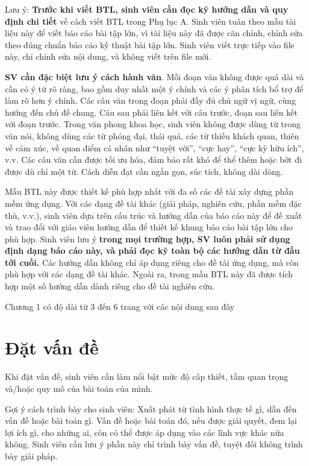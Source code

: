 \documentclass[../BTL.tex]{subfiles}
\begin{document}
Lưu ý: \textbf{Trước khi viết BTL, sinh viên cần đọc kỹ hướng dẫn và quy định chi tiết} về cách viết BTL trong Phụ lục A. Sinh viên tuân theo mẫu tài liệu này để viết báo cáo  bài tập lớn, vì tài liệu này đã được căn chỉnh, chỉnh sửa theo đúng chuẩn báo cáo kỹ thuật  bài tập lớn. Sinh viên viết trực tiếp vào file này, chỉ chỉnh sửa nội dung, và không viết trên file mới.

\textbf{SV cần đặc biệt lưu ý cách hành văn}. Mỗi đoạn văn không được quá dài và cần có ý tứ rõ ràng, bao gồm duy nhất một ý chính và các ý phân tích bổ trợ để làm rõ hơn ý chính. Các câu văn trong đoạn phải đầy đủ chủ ngữ vị ngữ, cùng hướng đến chủ đề chung. Câu sau phải liên kết với câu trước, đoạn sau liên kết với đoạn trước. Trong văn phong khoa học, sinh viên không được dùng từ trong văn nói, không dùng các từ phóng đại, thái quá, các từ thiếu khách quan, thiên về cảm xúc, về quan điểm cá nhân như “tuyệt vời”, “cực hay”, “cực kỳ hữu ích”, v.v. Các câu văn cần được tối ưu hóa, đảm bảo rất khó để thể thêm hoặc bớt đi được dù chỉ một từ. Cách diễn đạt cần ngắn gọn, súc tích, không dài dòng.

Mẫu BTL này được thiết kế phù hợp nhất với đa số các đề tài xây dựng phần mềm ứng dụng. Với các dạng đề tài khác (giải pháp, nghiên cứu, phần mềm đặc thù, v.v.), sinh viên dựa trên cấu trúc và hướng dẫn của báo cáo này để đề xuất và trao đổi với giáo viên hướng dẫn để thiết kế khung báo cáo  bài tập lớn cho phù hợp. Sinh viên lưu ý \textbf{trong mọi trường hợp, SV luôn phải sử dụng định dạng báo cáo này, và phải đọc kỹ toàn bộ các hướng dẫn từ đầu tới cuối.} Các hướng dẫn không chỉ áp dụng riêng cho đề tài ứng dụng, mà còn phù hợp với các dạng đề tài khác. Ngoài ra, trong mẫu BTL này đã được tích hợp một số hướng dẫn dành riêng cho đề tài nghiên cứu.

Chương 1 có độ dài từ 3 đến 6 trang với các nội dung sau đây

\section{Đặt vấn đề}
\label{section:1.1}
Khi đặt vấn đề, sinh viên cần làm nổi bật mức độ cấp thiết, tầm quan trọng và/hoặc quy mô của bài toán của mình.

Gợi ý cách trình bày cho sinh viên: Xuất phát từ tình hình thực tế gì, dẫn đến vấn đề hoặc bài toán gì. Vấn đề hoặc bài toán đó, nếu được giải quyết, đem lại lợi ích gì, cho những ai, còn có thể được áp dụng vào các lĩnh vực khác nữa không. Sinh viên cần lưu ý phần này chỉ trình bày vấn đề, tuyệt đối không trình bày giải pháp.
\end{document}
